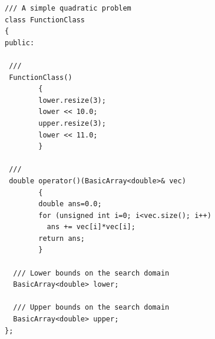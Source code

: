 {\small 
\begin{verbatim}
/// A simple quadratic problem
class FunctionClass
{
public:

 ///
 FunctionClass()
        {
        lower.resize(3);
        lower << 10.0;
        upper.resize(3);
        lower << 11.0;
        }

 ///
 double operator()(BasicArray<double>& vec)
        {
        double ans=0.0;
        for (unsigned int i=0; i<vec.size(); i++)
          ans += vec[i]*vec[i];
        return ans;
        }

  /// Lower bounds on the search domain
  BasicArray<double> lower;

  /// Upper bounds on the search domain
  BasicArray<double> upper;
};
\end{verbatim}
}

